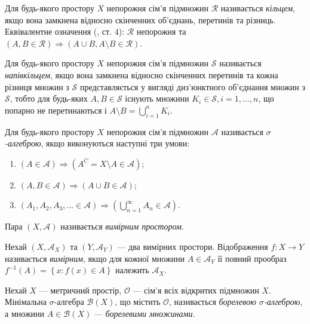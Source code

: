 \begin{definition}
    Для будь-якого простору $X$
    непорожня сім'я підмножин $\mathcal{R}$ 
    називається \emph{кільцем}, якщо
    вона замкнена відносно скінченних об'єднань, перетинів
    та різниць. Еквівалентне означення (\cite{Berezanskij}, ст. 4):
    $\mathcal{R}$ непорожня та
    $\left(A, B \in \mathcal{R}\right) \Rightarrow \left(A \cup B, A \setminus B\in \mathcal{R}\right)$.
\end{definition}
\begin{definition}
    Для будь-якого простору $X$
    непорожня сім'я підмножин $\mathcal{S}$ 
    називається \emph{напівкільцем}, якщо
    вона замкнена відносно скінченних перетинів та кожна різниця
    множин з $\mathcal{S}$ представляється
    у вигляді диз'юнктного об'єднання множин з $\mathcal{S}$, тобто
    для будь-яких $A, B \in \mathcal{S}$ існують
    множини $K_i \in \mathcal{S}, i = 1,\dots,n$,
    що попарно не перетинаються і $A \setminus B = \bigcup_{i=1}^n K_i$.
\end{definition}
\begin{definition}
    Для будь-якого простору $X$
    непорожня сім'я підмножин $\mathcal{A}$ 
    називається \emph{$\sigma$-алгеброю},
    якщо виконуються наступні три умови:
    \begin{enumerate}
        \item $\left(A \in \mathcal{A}\right) \Rightarrow \left(A^C = X \setminus A \in \mathcal{A}\right)$;
        \item $\left(A, B \in \mathcal{A}\right) \Rightarrow \left(A \cup B\in \mathcal{A}\right)$; 
        \item $\left(A_1, A_2, A_3, ... \in \mathcal{A}\right) \Rightarrow \left(\bigcup_{n=1}^{\infty} A_n \in \mathcal{A}\right)$.
    \end{enumerate} 
    Пара $\left(X, \mathcal{A}\right)$ називається \emph{вимірним простором}.
\end{definition}
\begin{definition}
    Нехай $\left(X, \mathcal{A}_X\right)$ та $\left(Y, \mathcal{A}_Y\right)$ ---
    два вимірних простори. Відображення $f: X \to Y$ називається 
    \emph{вимірним}, якщо для кожної множини
    $A \in \mathcal{A}_Y$ її повний прообраз
    $f^{-1}(A) = \left\{x : f(x) \in A\right\}$
    належить $\mathcal{A}_X$.
\end{definition}
\begin{definition}
    Нехай $X$ --- метричний простір, $\mathcal{O}$ ---
    сім'я всіх відкритих підмножин $X$. Мінімальна $\sigma$-алгебра
    $\mathcal{B}(X)$, що містить $\mathcal{O}$, називається
    \emph{борелевою $\sigma$-алгеброю}, а множини
    $A \in \mathcal{B}(X)$ --- \emph{борелевими множинами.}
\end{definition}
